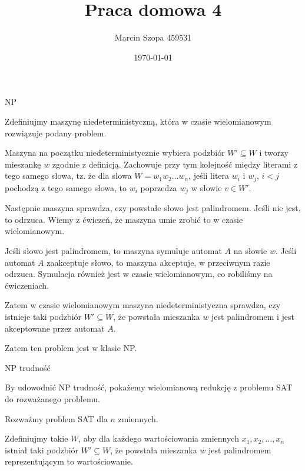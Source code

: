 \documentclass{article}
\title{Praca domowa 4}
\author{Marcin Szopa 459531}
\date{\today}
\theoremstyle{definition}
\theoremstyle{remark}
\begin{document}
\maketitle

\begin{section}{NP}

Zdefiniujmy maszynę niedeterministyczną, która w czasie wielomianowym rozwiązuje podany problem.

Maszyna na początku niedeterministycznie wybiera podzbiór $W' \subseteq W$ i tworzy mieszankę $w$ zgodnie z definicją.
Zachowuje przy tym kolejność między literami z tego samego słowa, tz. że dla słowa $W = w_1 w_2 \ldots w_n$, jeśli litera $w_i$ i $w_j$, $ i < j$ pochodzą z tego samego słowa, to
$w_i$ poprzedza $w_j$ w słowie $v \in W'$.

Następnie maszyna sprawdza, czy powstałe słowo jest palindromem. Jeśli nie jest, to odrzuca. Wiemy z ćwiczeń, że maszyna umie zrobić to w czasie wielomianowym.

Jeśli słowo jest palindromem, to maszyna symuluje automat $A$ na słowie $w$. Jeśli automat $A$ zaakceptuje słowo, to maszyna akceptuje, w przeciwnym razie odrzuca.
Symulacja również jest w czasie wielomianowym, co robiliśmy na ćwiczeniach.

Zatem w czasie wielomianowym maszyna niedeterministyczna sprawdza, czy istnieje taki podzbiór $W' \subseteq W$,
że powstała mieszanka $w$ jest palindromem i jest akceptowane przez automat $A$.

Zatem ten problem jest w klasie NP.

\end{section}

\begin{section}{NP trudność}

By udowodnić NP trudność, pokażemy wielomianową redukcję z problemu SAT do rozważanego problemu.

Rozważmy problem SAT dla $n$ zmiennych.

Zdefiniujmy takie $W$, aby dla każdego wartościowania zmiennych $x_1, x_2, \ldots, x_n$ istniał taki podzbiór $W' \subseteq W$,
 że powstała mieszanka $w$ jest palindromem reprezentującym to wartościowanie.





\end{section}
\end{document}
